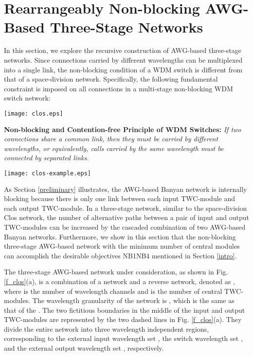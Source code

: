 \documentclass[journal]{IEEEtran}
\begin{document}
\section{Rearrangeably Non-blocking AWG-Based Three-Stage Networks}\label{RNB_design}
In this section, we explore the recursive construction of AWG-based
three-stage networks. Since connections carried by different
wavelengths can be multiplexed into a single link, the non-blocking
condition of a WDM switch is different from that of a space-division
network. Specifically, the following fundamental constraint is
imposed on all connections in a multi-stage non-blocking WDM switch
network:

\begin{figure*}[t]
\centering
\texttt{[image: clos.eps]}
\caption{AWG-based three-stage network: (a) 
and (b) space representation.}\label{f_clos}
\end{figure*}

\textbf{Non-blocking and Contention-free Principle of WDM Switches:}
\emph{If two connections share a common link, then they must be
carried by different wavelengths, or equivalently, calls carried by
the same wavelength must be connected by separated links.}

\begin{figure*}[t]
\centering
\texttt{[image: clos-example.eps]}
\caption{An AWG-based three-stage network: (a)
, (b) space representation, and (c) conflict
graph.}\label{f_clos-example}
\end{figure*}

As Section \ref{preliminary} illustrates, the AWG-based Banyan
network is internally blocking because there is only one link
between each input TWC-module and each output TWC-module. In a
three-stage network, similar to the space-division Clos network, the
number of alternative paths between a pair of input and output
TWC-modules can be increased by the cascaded combination of two
AWG-based Banyan networks. Furthermore, we show in this section that
the non-blocking three-stage AWG-based network with the minimum
number of central modules can accomplish the desirable objectives
NB1NB4 mentioned in Section \ref{intro}.

The  three-stage AWG-based network under consideration,
as shown in Fig. \ref{f_clos}(a), is a combination of a
 network and a reverse 
network, denoted as , where  is the
number of wavelength channels and  is the number of central
TWC-modules. The wavelength granularity of the network
 is , which is the same as that of
the . The two fictitious boundaries in the
middle of the input and output TWC-modules are represented by the
two dashed lines in Fig. \ref{f_clos}(a). They divide the entire
network into three wavelength independent regions, corresponding to
the external input wavelength set , the switch wavelength
set , and the external output wavelength set ,
respectively.
\end{document}
